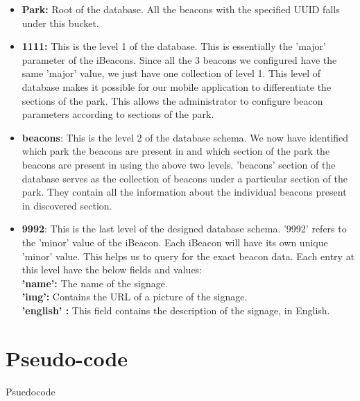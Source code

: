 \documentclass[12pt]{article}
\makeatletter
\def\BState{\State\hskip-\ALG@thistlm}
\makeatother
\begin{document}
\begin{itemize}
  \item \textbf{Park:} Root of the database. All the beacons with the specified UUID falls under this bucket. 
  
  \item \textbf{1111:} This is the level 1 of the database. This is essentially the 'major' parameter of the iBeacons. Since all the 3 beacons we configured have the same 'major' value, we just have one collection of level 1. This level of database makes it possible for our mobile application to differentiate the sections of the park. This allows the administrator to configure beacon parameters according to sections of the park.
  
  \item \textbf{beacons}: This is the level 2 of the database schema. We now have identified which park the beacons are present in and which section of the park the beacons are present in using the above two levels. 'beacons' section of the database serves as the collection of beacons under a particular section of the park. They contain all the information about the individual beacons present in discovered section.
  
    \item \textbf{9992}: This is the last level of the designed database schema. '9992' refers to the 'minor' value of the iBeacon. Each iBeacon will have its own unique 'minor' value. This helps us to query for the exact beacon data. Each entry at this level have the below fields and values: \\
    
    \textbf{'name':} The name of the signage. \\
    \textbf{'img':} Contains the URL of a picture of the signage. \\
    \textbf{'english' :} This field contains the description of the signage, in English.\\
  
\end{itemize}

\section{Pseudo-code}

\begin{algorithm}
\caption{Psuedocode}\label{euclid}
\end{algorithm}
\end{document}
